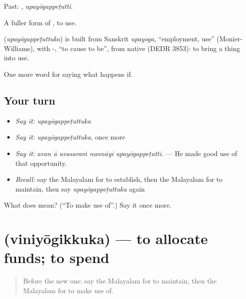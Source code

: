 Past: , \emph{upayōgappeṭutti}.

A fuller form of , to use.

\begin{cousinweb}
\textbf{} (\emph{upayōgappeṭuttuka}) is built from Sanskrit \emph{upayoga}, \textquotedblleft{}employment, use\textquotedblright{} (Monier-Williams), with -, \textquotedblleft{}to cause to be\textquotedblright{}, from native  (DEDR 3853): to bring a thing into use.
\end{cousinweb}

\begin{grammarlens}[title={What you've built}]
One more word for saying what happens if.
\end{grammarlens}

\subsection*{Your turn}
\begin{itemize}
\raggedright
  \item \emph{Say it:} \emph{upayōgappeṭuttuka}
  \item \emph{Say it:} \emph{upayōgappeṭuttuka}, once more
  \item \emph{Say it:} \emph{avan ā avasaraṁ nannāyi upayōgappeṭutti.} — He made good use of that opportunity.
  \item \emph{Recall:} say the Malayalam for to establish, then the Malayalam for to maintain, then say \emph{upayōgappeṭuttuka} again
\end{itemize}

\begin{tcolorbox}[breakable,colback=teal!4,colframe=teal!35!black,title={Before you move on}]
What does  mean? (\textquotedblleft{}To make use of\textquotedblright{}.) Say it once more.
\end{tcolorbox}
\section[\texorpdfstring{\ml{വിനിയോഗിക്കുക} (viniyōgikkuka)}{വിനിയോഗിക്കുക (viniyōgikkuka)}]{ (viniyōgikkuka) — to allocate funds; to spend}

\label{lesson:ML-C458-viniyogikkuka}



\begin{quote}
Before the new one: say the Malayalam for to maintain, then the Malayalam for to make use of.
\end{quote}

